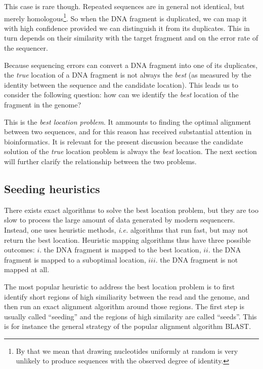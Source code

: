 \documentclass{article}
\begin{document}
This case is rare though. Repeated sequences are in general not identical,
but merely homologous\footnote{By that we mean that drawing nucleotides
uniformly at random is very unlikely to produce sequences with the
observed degree of identity.}. So when the DNA fragment is duplicated, we
can map it with high confidence provided we can distinguish it from its
duplicates. This in turn depends on their similarity with the target
fragment and on the error rate of the sequencer.

Because sequencing errors can convert a DNA fragment into one of its
duplicates, the \emph{true} location of a DNA fragment is not always the
\emph{best} (as measured by the identity between the sequence and the
candidate location). This leads us to consider the following question: how
can we identify the \emph{best} location of the fragment in the genome? 

This is the \emph{best location problem}. It ammounts to finding the
optimal alignment between two sequences, and for this reason has received
substantial attention in bioinformatics. It is relevant for the present
discussion because the candidate solution of the \emph{true} location
problem is always the \emph{best} location. The next section will further
clarify the relationship between the two problems.


\subsection{Seeding heuristics}
\label{sec:seedheur}

There exists exact algorithms to solve the best location
problem\cite{pmid7265238,pmid5420325}, but they are too slow to process
the large amount of data generated by modern sequencers. Instead, one uses
heuristic methods, \textit{i.e.} algorithms that run fast, but may not
return the best location\cite{Waterman1984}. Heuristic mapping algorithms
thus have three possible outcomes: $i.$ the DNA fragment is mapped to the
best location, $ii.$ the DNA fragment is mapped to a suboptimal location,
$iii.$ the DNA fragment is not mapped at all.

The most popular heuristic to address the best location problem is to
first identify short regions of high similiarity between the read and the
genome, and then run an exact alignment algorithm around those regions.
The first step is usually called ``seeding'' and the regions of high
similarity are called ``seeds''. This is for instance the general strategy
of the popular alignment algorithm BLAST\cite{pmid2231712}.
\end{document}

